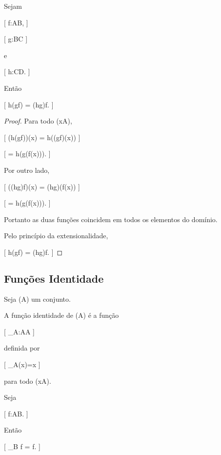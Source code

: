 \documentclass[../../main]{subfiles}
\begin{document}
\begin{prop}[Associatividade]
	\label{prop:matematica:funcoes:composicao:associatividade}

	Sejam

		[
			f:A\to B,
		]

		[
			g:B\to C
		]

	e

		[
			h:C\to D.
		]

	Então

	[
	h\circ(g\circ f)
	=
	(h\circ g)\circ f.
	]

\end{prop}

\begin{proof}

	Para todo (x\in A),

	[
			(h\circ(g\circ f))(x)
			=
			h((g\circ f)(x))
		]

		[
			=
			h(g(f(x))).
		]

	Por outro lado,

	[
			((h\circ g)\circ f)(x)
			=
			(h\circ g)(f(x))
		]

		[
			=
			h(g(f(x))).
		]

	Portanto as duas funções coincidem em todos os elementos do domínio.

	Pelo princípio da extensionalidade,

	[
			h\circ(g\circ f)
			=
			(h\circ g)\circ f.
		]

\end{proof}

\subsection{Funções Identidade}

\begin{defn}
	\label{def:matematica:funcoes:composicao:identidade}

	Seja (A) um conjunto.

	A função identidade de (A) é a função

	[
	_A:A\to A
	]

	definida por

		[
			\operatorname{id}_A(x)=x
		]

	para todo (x\in A).

\end{defn}

\begin{prop}
	\label{prop:matematica:funcoes:composicao:neutro-esquerda}

	Seja

		[
			f:A\to B.
		]

	Então

	[
	_B
	\circ
	f
	=
	f.
	]

\end{prop}
\end{document}
